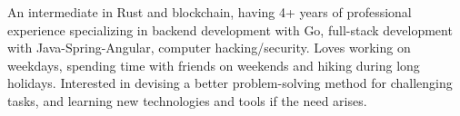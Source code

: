 

\begin{cvparagraph}

    An intermediate in Rust and blockchain, having 4+ years of professional experience specializing in backend development
    with Go, full-stack development with Java-Spring-Angular, computer hacking/security. Loves working on weekdays,
    spending time with friends on weekends and hiking during long holidays. Interested in devising a better
    problem-solving method for challenging tasks, and learning new technologies and tools if the need arises.
\end{cvparagraph}
